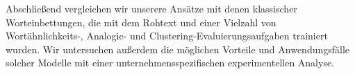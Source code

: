 Abschließend vergleichen wir unserere Ansätze mit denen klassischer Worteinbettungen, die mit dem Rohtext und einer Vielzahl von Wortähnlichkeits-, Analogie- und Clustering-Evaluierungs\-aufgaben trainiert wurden. Wir untersuchen außerdem die möglichen Vorteile und Anwendungsfälle solcher Modelle mit einer unternehmensspezifischen experimentellen Analyse.